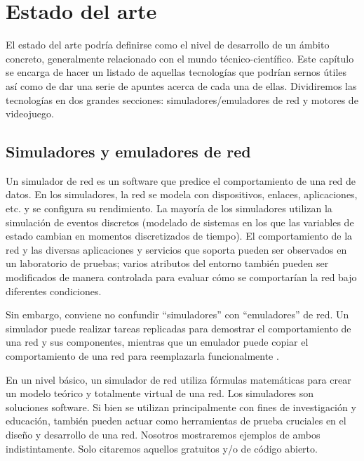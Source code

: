 \chapter{Estado del arte}\label{chap:ArtState}

El estado del arte podría definirse como el nivel de desarrollo de un ámbito concreto, generalmente relacionado con el mundo técnico-científico. Este capítulo se encarga de hacer un listado de aquellas tecnologías que podrían sernos útiles así como de dar una serie de apuntes acerca de cada una de ellas. Dividiremos las tecnologías en dos grandes secciones: simuladores/emuladores de red y motores de videojuego.

\section{Simuladores y emuladores de red}\label{sec:simuladoremulador}
Un simulador de red es un software que predice el comportamiento de una red de datos. En los simuladores, la red se modela con dispositivos, enlaces, aplicaciones, etc. y se configura su rendimiento. La mayoría de los simuladores utilizan la simulación de eventos discretos (modelado de sistemas en los que las variables de estado cambian en momentos discretizados de tiempo)\cite{wiki:Network_simulation}. El comportamiento de la red y las diversas aplicaciones y servicios que soporta pueden ser observados en un laboratorio de pruebas; varios atributos del entorno también pueden ser modificados de manera controlada para evaluar cómo se comportarían la red bajo diferentes condiciones.

Sin embargo, conviene no confundir ``simuladores'' con ``emuladores'' de red. Un simulador puede realizar tareas replicadas para demostrar el comportamiento de una red y sus componentes, mientras que un emulador puede copiar el comportamiento de una red para reemplazarla funcionalmente \cite{emsim}.

En un nivel básico, un simulador de red utiliza fórmulas matemáticas para crear un modelo teórico y totalmente virtual de una red. Los simuladores son soluciones software. Si bien se utilizan principalmente con fines de investigación y educación, también pueden actuar como herramientas de prueba cruciales en el diseño y desarrollo de una red. Nosotros mostraremos ejemplos de ambos indistintamente. Solo citaremos aquellos gratuitos y/o de código abierto.

